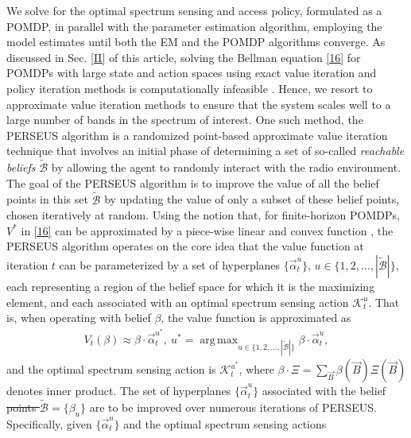 \documentclass[10pt,twocolumn]{IEEEtran}
\newcommand{\sst}[1]{\st{#1}}
\DeclareMathOperator*{\argmax}{arg\,max}
\newcommand{\add}[1]{{\color{red}{#1}}}
\begin{document}
We solve for the optimal spectrum sensing and access policy, formulated as a POMDP, in parallel with the parameter estimation algorithm, employing the model estimates until both the EM and the POMDP algorithms converge. As discussed in Sec. \ref{II} of this article, solving the Bellman equation \eqref{16} for POMDPs with large state and action spaces using exact value iteration and policy iteration methods is computationally infeasible \cite{DBLP:journals/corr/abs-1109-2145}. Hence, we resort to approximate value iteration methods to ensure that the system scales well to a large number of bands in the spectrum of interest. One such method, the PERSEUS algorithm \cite{DBLP:journals/corr/abs-1109-2145} is a randomized point-based approximate value iteration technique that involves an initial phase of determining a set of so-called \emph{reachable beliefs} $\tilde{\mathcal{B}}$ by allowing the agent to randomly interact with the radio environment. The goal of the PERSEUS algorithm is to improve the value of all the belief points in this set $\tilde{\mathcal{B}}$ by updating the value of only a subset of these belief points, chosen iteratively at random. Using the notion that, for finite-horizon POMDPs, $V^*$ in \eqref{16} can be approximated by a piece-wise linear and convex function \cite{DBLP:journals/corr/abs-1109-2145}, the PERSEUS algorithm operates on the core idea that the value function at iteration $t$ can be parameterized by a set of hyperplanes $\{\vec{\alpha}_{t}^{u}\}$, $u {\in} \{1,2,\dots,|\tilde{\mathcal{B}}|\}$, each representing a region of the belief space for which it is the maximizing element, and each associated with an optimal spectrum sensing action $\mathcal K_t^{u}$. That is, when operating with belief $\beta$, the value function is approximated as
\begin{equation}
    \begin{aligned}\label{40}
        V_{t}(\beta) \approx \beta \cdot \vec{\alpha}_{t}^{u^*},
        \ 
        u^* = \argmax_{u\in\{1,2,\dots,|\tilde{\mathcal{B}}|\}} \beta \cdot \vec{\alpha}_{t}^{u},
    \end{aligned}
\end{equation}
and the optimal spectrum sensing action is $\mathcal K_t^{u^*}$, where\sst{ $\beta\cdot\Xi{=}\sum_{\vec{B}}\beta(\vec{B})\Xi(\vec{B})$}
\add{$\beta\cdot\vec{\alpha}{=}\sum_{\vec{B}}\beta(\vec{B})\vec{\alpha}(\vec{B})$}
 denotes inner product. The set of hyperplanes $\{\vec{\alpha}_{t}^{u}\}$ associated with the belief\sst{ points $\tilde{\mathcal{B}}{=}\{\beta_u\}$} \add{set $\tilde{\mathcal{B}}$} are to be improved over numerous iterations of PERSEUS. Specifically, given $\{\vec{\alpha}_{t}^{u}\}$ and the optimal spectrum sensing actions
\end{document}
